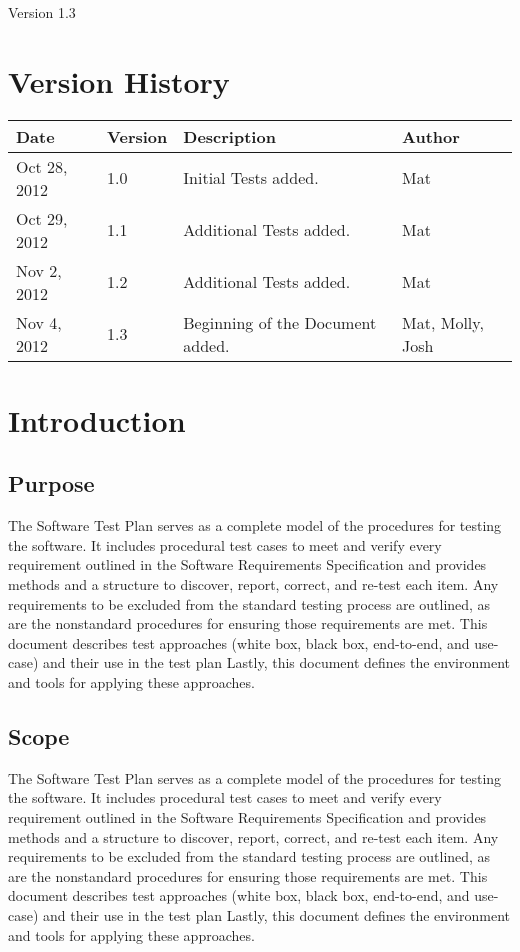 \documentclass{article}
\title{\Title}
\author{\Author}
\date{\today}
\def\STPVersion{1.3}
\def\Version{\STPVersion}
\newcommand{\setupintro}{
\renewcommand{\thepage}{}
\maketitle
\begin{center}
\large Version \Version \normalsize
\end{center}
\newpage
\setcounter{page}{1}
\renewcommand{\thepage}{\roman{page}}
\tableofcontents 
\newpage
\setcounter{page}{1}
\renewcommand{\thepage}{\arabic{page}}
}
\begin{document}
\setupintro



\section{Version History}
\begin{tabular}{|l|l|p{3.25in}|l|}
\hline
Date & Version & Description & Author \\\hline
Oct 28, 2012 & 1.0 & Initial Tests added. & Mat\\\hline
Oct 29, 2012 & 1.1 &Additional Tests added.& Mat \\\hline
Nov 2, 2012 & 1.2 &Additional Tests added.& Mat \\\hline
Nov 4, 2012 & 1.3 &Beginning of the Document added.& Mat, Molly, Josh \\\hline
\end{tabular}

\section{Introduction}

\subsection{Purpose}

The Software Test Plan serves as a complete model of the procedures for testing the software.  It includes procedural test cases to meet and verify every requirement outlined in the Software Requirements Specification and provides methods and a structure to discover, report, correct, and re-test each item.  Any requirements to be excluded from the standard testing process are outlined, as are the nonstandard procedures for ensuring those requirements are met.  This document describes test approaches (white box, black box, end-to-end, and use-case) and their use in the test plan  Lastly, this document defines the environment and tools for applying these approaches.  


\subsection{Scope}

The Software Test Plan serves as a complete model of the procedures for testing the software.  It includes procedural test cases to meet and verify every requirement outlined in the Software Requirements Specification and provides methods and a structure to discover, report, correct, and re-test each item.  Any requirements to be excluded from the standard testing process are outlined, as are the nonstandard procedures for ensuring those requirements are met.  This document describes test approaches (white box, black box, end-to-end, and use-case) and their use in the test plan  Lastly, this document defines the environment and tools for applying these approaches.  
\end{document}

